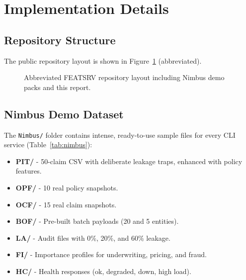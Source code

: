 \documentclass[11pt,a4paper]{article}
\begin{document}
\section{Implementation Details}

\subsection{Repository Structure}
The public repository layout is shown in Figure~\ref{fig:repo} (abbreviated).

\begin{figure}[ht]
\centering
{}
\caption{Abbreviated FEATSRV repository layout including Nimbus demo packs and this report.}
\label{fig:repo}
\end{figure}

\subsection{Nimbus Demo Dataset}
The \texttt{Nimbus/} folder contains intense, ready-to-use sample files for every CLI service (Table~\ref{tab:nimbus}):
\begin{itemize}[leftmargin=1.5em]
\item \textbf{PIT/} - 50-claim CSV with deliberate leakage traps, enhanced with policy features.
\item \textbf{OPF/} - 10 real policy snapshots.
\item \textbf{OCF/} - 15 real claim snapshots.
\item \textbf{BOF/} - Pre-built batch payloads (20 and 5 entities).
\item \textbf{LA/} - Audit files with 0\%, 20\%, and 60\% leakage.
\item \textbf{FI/} - Importance profiles for underwriting, pricing, and fraud.
\item \textbf{HC/} - Health responses (ok, degraded, down, high load).
\end{itemize}
\end{document}
